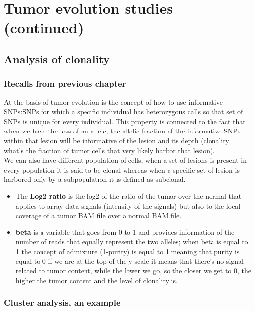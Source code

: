 \graphicspath{{chapters/TumorEvStudiesIIImages/}}
\chapter{Tumor evolution studies (continued)}

\section{Analysis of clonality}
\subsection{Recalls from previous chapter}
At the basis of tumor evolution is the concept of how to use informative SNPs:SNPs for which a specific individual has heterozygous calls so that set of SNPs is unique for every individual.
This property is connected to the fact that when we have the loss of an allele, the allelic fraction of the informative SNPs within that lesion will be informative of the lesion and its depth (clonality = what's the fraction of tumor cells that very likely harbor that lesion).
\\
We can also have different population of cells, when a set of lesions is present in every population it is said to be clonal whereas when a specific set of lesion is harbored only by a subpopulation it is defined as subclonal.

\begin{itemize}
\item The \textbf{Log2 ratio} is the log2 of the ratio of the tumor over the normal that
applies to array data signals (intensity of the signals) but also to the local
coverage of a tumor BAM file over a normal BAM file.
\item \textbf{beta} is a variable that goes from 0 to 1 and provides information of
the number of reads that equally represent the two alleles; when beta is equal
to 1 the concept of admixture (1-purity) is equal to 1 meaning that purity is
equal to 0 if we are at the top of the y scale it means that there's no signal
related to tumor content, while the lower we go, so the closer we get to 0, the
higher the tumor content and the level of clonality is.
\end{itemize}

\subsection{Cluster analysis, an example}


